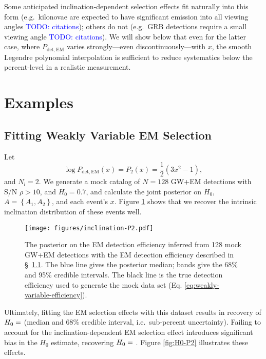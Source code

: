 \documentclass[modern]{aastex631}
\newcommand{\todo}[1]{\textcolor{blue}{TODO: #1}}
\newcommand{\detected}{\mathrm{det}}
\newcommand{\EM}{\mathrm{EM}}
\begin{document}
Some anticipated inclination-dependent selection effects fit naturally into this
form (e.g.\ kilonovae are expected to have significant emission into all viewing
angles \todo{citations}); others do not (e.g.\ GRB detections require a small
viewing angle \todo{citations}).  We will show below that even for the latter
case, where $P_{\detected,\EM}$ varies strongly---even discontinuously---with
$x$, the smooth Legendre polynomial interpolation is sufficient to reduce
systematics below the percent-level in a realistic measurement.

\section{Examples}

\subsection{Fitting Weakly Variable EM Selection}
\label{sec:weakly-variable}

Let 
\begin{equation}
    \label{eq:weakly-variable-efficiency}
    \log P_{\detected,\EM}(x) = P_2(x) = \frac{1}{2}\left( 3 x^2 - 1 \right),
\end{equation}
and $N_l = 2$.  We generate a mock catalog of $N = 128$ GW+EM detections with
S/N $\rho > 10$, and $H_0 = 0.7$, and calculate the joint posterior on $H_0$, $A
= \left\{ A_1, A_2 \right\}$, and each event's $x$.  Figure
\ref{fig:inclination-P2} shows that we recover the intrinsic inclination
distribution of these events well.

\begin{figure}
    \texttt{[image: figures/inclination-P2.pdf]}
    \caption{The posterior on the EM detection efficiency inferred from 128 mock
    GW+EM detections with the EM detection efficiency described in \S\
    \ref{sec:weakly-variable}.  The blue line gives the posterior median; bands
    give the 68\% and 95\% credible intervals.  The black line is the true
    detection efficiency used to generate the mock data set (Eq.
    \eqref{eq:weakly-variable-efficiency}).}
    \label{fig:inclination-P2} 
\end{figure}

Ultimately, fitting the EM selection effects with this dataset results in
recovery of $H_0 = \variable{output/H0-P2.txt}$ (median and 68\% credible
interval, i.e.\ sub-percent uncertainty). Failing to account for the
inclination-dependent EM selection effect introduces significant bias in the
$H_0$ estimate, recovering $H_0 = \variable{output/H0-P2-nofit.txt}$
\citep{Chen2020}.  Figure \ref{fig:H0-P2} illustrates these effects.
\end{document}
